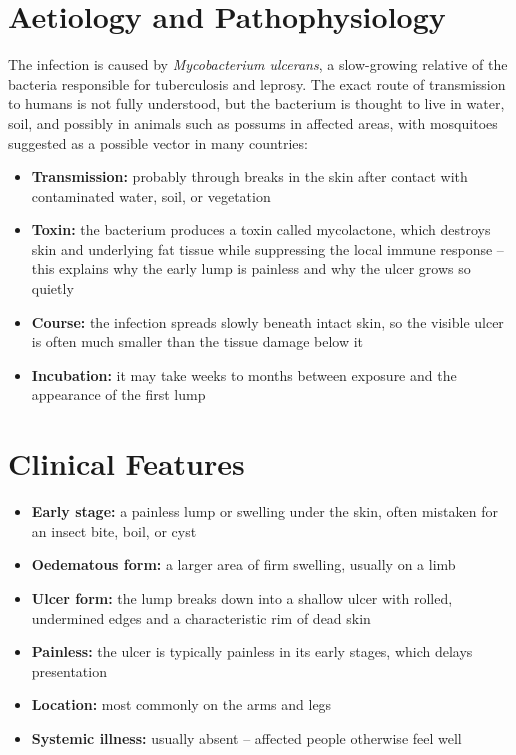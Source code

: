 \section*{Aetiology and Pathophysiology}
The infection is caused by \textit{Mycobacterium ulcerans}, a slow-growing relative of the bacteria responsible for tuberculosis and leprosy. The exact route of transmission to humans is not fully understood, but the bacterium is thought to live in water, soil, and possibly in animals such as possums in affected areas, with mosquitoes suggested as a possible vector in many countries:
\begin{itemize}
    \item \textbf{Transmission:} probably through breaks in the skin after contact with contaminated water, soil, or vegetation
    \item \textbf{Toxin:} the bacterium produces a toxin called mycolactone, which destroys skin and underlying fat tissue while suppressing the local immune response -- this explains why the early lump is painless and why the ulcer grows so quietly
    \item \textbf{Course:} the infection spreads slowly beneath intact skin, so the visible ulcer is often much smaller than the tissue damage below it
    \item \textbf{Incubation:} it may take weeks to months between exposure and the appearance of the first lump
\end{itemize}

\section*{Clinical Features}
\begin{itemize}
    \item \textbf{Early stage:} a painless lump or swelling under the skin, often mistaken for an insect bite, boil, or cyst
    \item \textbf{Oedematous form:} a larger area of firm swelling, usually on a limb
    \item \textbf{Ulcer form:} the lump breaks down into a shallow ulcer with rolled, undermined edges and a characteristic rim of dead skin
    \item \textbf{Painless:} the ulcer is typically painless in its early stages, which delays presentation
    \item \textbf{Location:} most commonly on the arms and legs
    \item \textbf{Systemic illness:} usually absent -- affected people otherwise feel well
\end{itemize}

